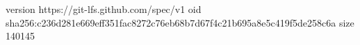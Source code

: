 version https://git-lfs.github.com/spec/v1
oid sha256:c236d281e669eff351fac8272c76eb68b7d67f4c21b695a8e5c419f5de258c6a
size 140145
